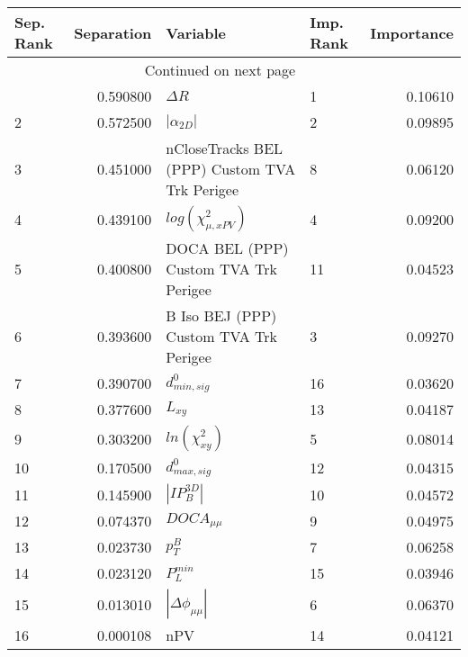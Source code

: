 \usepackage{lscape}

\begin{landscape}
\begin{longtable}{lrllr}
\toprule
Sep. Rank &  Separation &                                       Variable & Imp. Rank &  Importance \\
\midrule
\endhead
\midrule
\multicolumn{3}{r}{{Continued on next page}} \\
\midrule
\endfoot

\bottomrule
\endlastfoot
        1 &    0.590800 &                                     $\Delta R$ &         1 &     0.10610 \\
        2 &    0.572500 &                                $|\alpha_{2D}|$ &         2 &     0.09895 \\
        3 &    0.451000 &  nCloseTracks BEL (PPP) Custom TVA Trk Perigee &         8 &     0.06120 \\
        4 &    0.439100 &                      $log(\chi^{2}_{\mu,xPV})$ &         4 &     0.09200 \\
        5 &    0.400800 &          DOCA BEL (PPP) Custom TVA Trk Perigee &        11 &     0.04523 \\
        6 &    0.393600 &         B Iso BEJ (PPP) Custom TVA Trk Perigee &         3 &     0.09270 \\
        7 &    0.390700 &                               $d^0_{min, sig}$ &        16 &     0.03620 \\
        8 &    0.377600 &                                       $L_{xy}$ &        13 &     0.04187 \\
        9 &    0.303200 &                            $ln(\chi^{2}_{xy})$ &         5 &     0.08014 \\
       10 &    0.170500 &                               $d^0_{max, sig}$ &        12 &     0.04315 \\
       11 &    0.145900 &                                $|IP_{B}^{3D}|$ &        10 &     0.04572 \\
       12 &    0.074370 &                                $DOCA_{\mu\mu}$ &         9 &     0.04975 \\
       13 &    0.023730 &                                      $p^B_{T}$ &         7 &     0.06258 \\
       14 &    0.023120 &                                  $P^{min}_{L}$ &        15 &     0.03946 \\
       15 &    0.013010 &                       $|\Delta \phi_{\mu\mu}|$ &         6 &     0.06370 \\
       16 &    0.000108 &                                            nPV &        14 &     0.04121 \\
\end{longtable}

\end{landscape}
